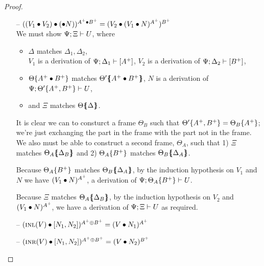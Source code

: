 \begin{proof}
\begin{itemize}
\item[--] $({({V_1} \mathbin{\bullet} {V_2})} \bullet {({\mathbin{\bullet}}{N}}))^{A^+ \mathbin{\bullet} B^+}
           = ({V_2} \bullet {({V_1} \bullet {N})^{A^+}})^{B^+}$ \\
  We must show ${\Psi};{\Xi} \vdash {U}$, where
  \begin{itemize}
  \item $\Delta$ matches $\Delta_1, \Delta_2$,\\
        $V_1$ is a derivation of ${\Psi};{\Delta_1} \vdash {[A^+]}$,
        $V_2$ is a derivation of ${\Psi};{\Delta_2} \vdash {[B^+]}$,
  \item ${\Theta}\{{A^+ \mathbin{\bullet} B^+}\}$ matches
        ${\Theta'}\mbox{$\{\hspace{-4pt}\{$}{A^+ \mathbin{\bullet}B^+}\mbox{$\}\hspace{-4pt}\}$}$, 
        $N$ is a derivation of 
        ${\Psi};{{\Theta'}\{{A^+, B^+}\}} \vdash {U}$, 
  \item and $\Xi$ matches ${\Theta}\mbox{$\{\hspace{-4pt}\{$}{\Delta}\mbox{$\}\hspace{-4pt}\}$}$.
  \end{itemize}

  It is clear we can to consturct a frame $\Theta_B$ such that
  ${\Theta'}\{{A^+, B^+}\} = {\Theta_B}\{{A^+}\}$; we're just exchanging
  the part in the frame with the part not in the frame. We also 
  must be able to construct a second frame, $\Theta_A$, such that
  1) $\Xi$ matches ${\Theta_A}\mbox{$\{\hspace{-4pt}\{$}{\Delta_B}\mbox{$\}\hspace{-4pt}\}$}$ and 
  2) ${\Theta_A}\{{B^+}\}$ matches ${\Theta_B}\mbox{$\{\hspace{-4pt}\{$}{\Delta_A}\mbox{$\}\hspace{-4pt}\}$}$.


  Because ${\Theta_A}\{{B^+}\}$ matches ${\Theta_B}\mbox{$\{\hspace{-4pt}\{$}{\Delta_A}\mbox{$\}\hspace{-4pt}\}$}$,
  by the induction hypothesis on $V_1$ and $N$ we have
  $({V_1} \bullet {N})^{A^+}$, a derivation of 
  ${\Psi};{{\Theta_A}\{{B^+}\}} \vdash {U}$.

  Because $\Xi$ matches ${\Theta_A}\mbox{$\{\hspace{-4pt}\{$}{\Delta_B}\mbox{$\}\hspace{-4pt}\}$}$, by the induction
  hypothesis on $V_2$ and $({V_1} \bullet {N})^{A^+}$, we have a derivation
  of ${\Psi};{\Xi} \vdash {U}$ as required.

\item[--] $({\textsc{inl}({V})} \bullet {[{N_1},{N_2}]})^{A^+ \oplus B^+} 
           = ({V} \bullet {N_1})^{A^+}$

\item[--] $({\textsc{inr}({V})} \bullet {[{N_1},{N_2}]})^{A^+ \oplus B^+} 
           = ({V} \bullet {N_2})^{B^+}$


\end{itemize}
\end{proof}
